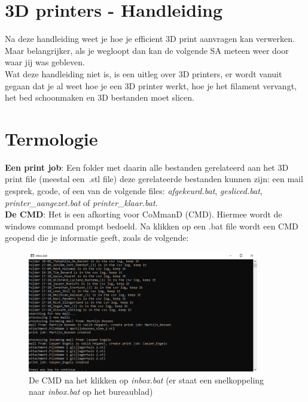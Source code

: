 \documentclass{article}
\begin{document}
\pagestyle{empty}
\large
\section*{\centering\hspace{-1cm}3D printers - Handleiding}
Na deze handleiding weet je hoe je efficient 3D print aanvragen kan verwerken. Maar belangrijker, als je wegloopt dan kan de volgende SA meteen weer door waar jij was gebleven.\\

Wat deze handleiding niet is, is een uitleg over 3D printers, er wordt vanuit gegaan dat je al weet hoe je een 3D printer werkt, hoe je het filament vervangt, het bed schoonmaken en 3D bestanden moet slicen.\\

\section*{Termologie}
\noindent\textbf{Een print job}: Een folder met daarin alle bestanden gerelateerd aan het 3D print file (meestal een~.stl file) deze gerelateerde bestanden kunnen zijn: een mail gesprek, gcode, of een van de volgende files: \textit{afgekeurd.bat}, \textit{gesliced.bat}, \textit{printer\_aangezet.bat} of \textit{printer\_klaar.bat}.\\

\noindent\textbf{De CMD}: Het is een afkorting voor CoMmanD (CMD). Hiermee wordt de windows command prompt bedoeld. Na klikken op een .bat file wordt een CMD geopend die je informatie geeft, zoals de volgende:
\begin{figure}[H]
    \centering
    \includegraphics[width=0.9\textwidth]{figures/cmd}
    \caption*{De CMD na het klikken op \textit{inbox.bat} (er staat een snelkoppeling naar \textit{inbox.bat} op het bureaublad)}%
\end{figure}
\end{document}
